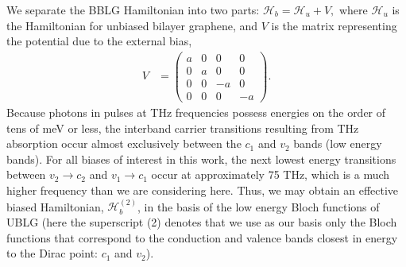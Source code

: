 \documentclass[twocolumn,secnumarabic,amssymb, nobibnotes, aps, prd, superscriptaddress]{revtex4-1}
\begin{document}
We separate the BBLG Hamiltonian into two parts: $\mathcal{H}_{b} =\mathcal{H}_{u}+V,$ where $\mathcal{H}_{u}$ is the Hamiltonian for unbiased bilayer graphene, and $V$ is the matrix representing the potential due to the external bias,
\begin{equation}
\begin{aligned}V & =\left(\begin{array}{cccc}
a & 0 & 0 & 0\\
0 & a & 0 & 0\\
0 & 0 & -a & 0\\
0 & 0 & 0 & -a
\end{array}\right).\end{aligned}
 \end{equation}
Because photons in pulses at THz frequencies possess energies on the order of tens of meV or less, the interband carrier transitions resulting from THz absorption occur almost exclusively between the $c_{1}$ and $v_{2}$ bands (low energy bands). For all biases of interest in this work, the next lowest energy transitions between $v_{2}\rightarrow c_{2}$ and $v_{1}\rightarrow c_{1}$ occur at approximately 75 THz, which is a much higher frequency than we are considering here. Thus, we may obtain an effective biased Hamiltonian, $\mathcal{H}_{b}^{(2)}$, in the basis of the low energy Bloch functions of UBLG (here the superscript (2) denotes that we use as our basis only the Bloch functions that correspond to the conduction and valence bands closest in energy to the Dirac point: $c_{1}$ and $v_{2}$). 

\end{document}
